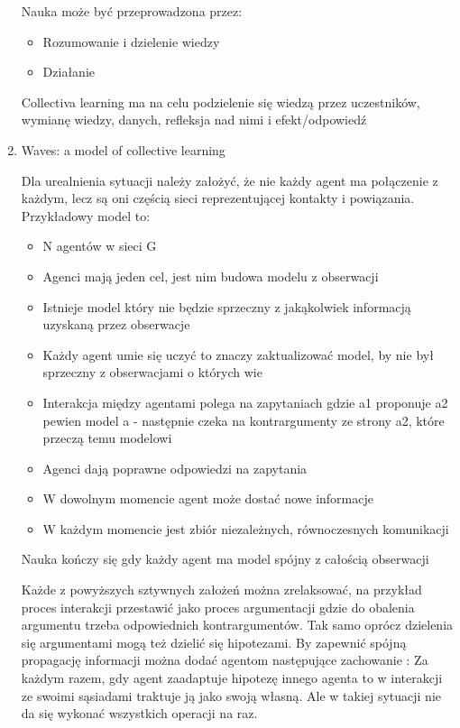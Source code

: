 \documentclass[11pt]{aghdpl}
\begin{document}
\begin{enumerate}
Nauka może być przeprowadzona przez:
\begin{itemize}
        \item Rozumowanie i dzielenie wiedzy
        \item Działanie
\end{itemize}

Collectiva learning ma na celu podzielenie się wiedzą przez uczestników, wymianę wiedzy, danych, refleksja nad nimi i efekt/odpowiedź

\item Waves: a model of collective learning \cite{WavesModelOfCollectiveLearning}

Dla urealnienia sytuacji należy założyć, że nie każdy agent ma połączenie z każdym, lecz są oni częścią sieci reprezentującej kontakty i powiązania.
Przykładowy model to:

\begin{itemize}
        \item N agentów w sieci G
        \item Agenci mają jeden cel, jest nim budowa modelu z obserwacji
        \item Istnieje model który nie będzie sprzeczny z jakąkolwiek informacją uzyskaną przez obserwacje
        \item Każdy agent umie się uczyć to znaczy zaktualizować model, by nie był sprzeczny z obserwacjami o których wie
        \item Interakcja między agentami polega na zapytaniach gdzie a1 proponuje a2 pewien model a - następnie czeka na kontrargumenty ze strony a2, które przeczą temu modelowi
        \item Agenci dają poprawne odpowiedzi na zapytania
        \item W dowolnym momencie agent może dostać nowe informacje
        \item W każdym momencie jest zbiór niezależnych, równoczesnych komunikacji
\end{itemize}

Nauka kończy się gdy każdy agent ma model spójny z całością obserwacji

Każde z powyższych sztywnych założeń można zrelaksować, na przykład proces interakcji przestawić jako proces argumentacji gdzie do obalenia argumentu trzeba odpowiednich kontrargumentów. Tak samo oprócz dzielenia się argumentami mogą też dzielić się hipotezami.
By zapewnić spójną propagację informacji można dodać agentom następujące zachowanie : Za każdym razem, gdy agent zaadaptuje hipotezę innego agenta to w interakcji ze swoimi sąsiadami traktuje ją jako swoją własną. Ale w takiej sytuacji nie da się wykonać wszystkich operacji na raz.


\end{enumerate}
\end{document}
